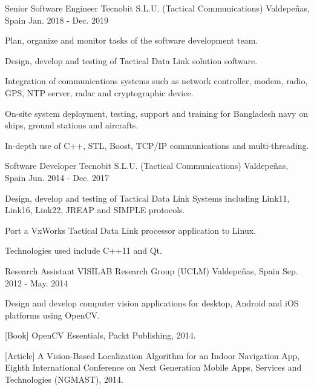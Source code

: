 \begin{cventries}
  \cventry
    {Senior Software Engineer} %
    {Tecnobit S.L.U. (Tactical Communications)} %
    {Valdepeñas, Spain} %
    {Jan. 2018 - Dec. 2019} %
    {
      \begin{cvitems} %
        \item {Plan, organize and monitor tasks of the software development team.}
        \item {Design, develop and testing of Tactical Data Link solution software.}
        \item {Integration of communications systems such as network controller, modem, radio, GPS, NTP server, radar and cryptographic device.}
        \item {On-site system deployment, testing, support and training for Bangladesh navy on ships, ground stations and aircrafts.}
        \item {In-depth use of C++, STL, Boost, TCP/IP communications and multi-threading.}
      \end{cvitems}
    }

  \cventry
    {Software Developer} %
    {Tecnobit S.L.U. (Tactical Communications)} %
    {Valdepeñas, Spain} %
    {Jun. 2014 - Dec. 2017} %
    {
      \begin{cvitems} %
        \item {Design, develop and testing of Tactical Data Link Systems including Link11, Link16, Link22, JREAP and SIMPLE protocols.}
        \item {Port a VxWorks Tactical Data Link processor application to Linux.}
        \item {Technologies used include C++11 and Qt.}
      \end{cvitems}
    }


  \cventry
    {Research Assistant} %
    {VISILAB Research Group (UCLM)} %
    {Valdepeñas, Spain} %
    {Sep. 2012 - May. 2014} %
    {
      \begin{cvitems} %
        \item {Design and develop computer vision applications for desktop, Android and iOS platforms using OpenCV.}
        \item {[Book] OpenCV Essentials, Packt Publishing, 2014.}
        \item {[Article] A Vision-Based Localization Algorithm for an Indoor Navigation App, Eighth International Conference on Next Generation Mobile Apps, Services and Technologies (NGMAST), 2014.}
      \end{cvitems}
    }




\end{cventries}
